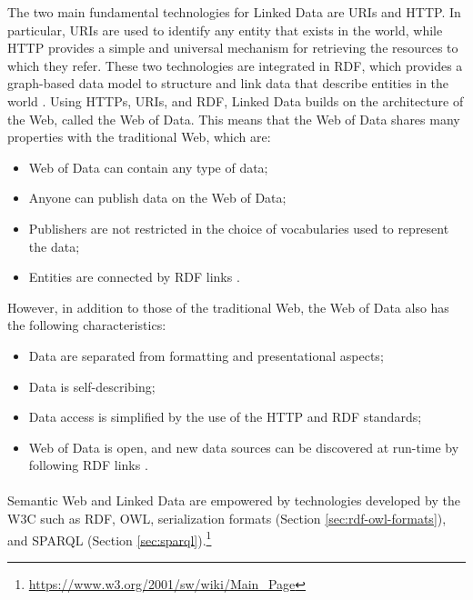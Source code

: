 The two main fundamental technologies for Linked Data are \acp{URI} and \ac{HTTP}. In particular, \acp{URI} are used to identify any entity that exists in the world, while \ac{HTTP} provides a simple and universal mechanism for retrieving the resources to which they refer. These two technologies are integrated in \ac{RDF}, which provides a graph-based data model to structure and link data that describe entities in the world \cite{bizer2011linked}. Using \acp{HTTP}, \acp{URI}, and \ac{RDF}, Linked Data builds on the architecture of the Web, called the Web of Data. This means that the Web of Data shares many properties with the traditional Web, which are:

\begin{itemize}
    \item Web of Data can contain any type of data;
    \item Anyone can publish data on the Web of Data;
    \item Publishers are not restricted in the choice of vocabularies used to represent the data;
    \item Entities are connected by \ac{RDF} links \cite{bizer2011linked}.
\end{itemize}

However, in addition to those of the traditional Web, the Web of Data also has the following characteristics:

\begin{itemize}
    \item Data are separated from formatting and presentational aspects;
    \item Data is self-describing;
    \item Data access is simplified by the use of the \ac{HTTP} and \ac{RDF} standards;
    \item Web of Data is open, and new data sources can be discovered at run-time by following \ac{RDF} links \cite{bizer2011linked}.
\end{itemize}

\paragraph*{}
Semantic Web and Linked Data are empowered by technologies developed by the \acl{W3C} such as \acs{RDF}, \acs{OWL}, serialization formats (Section \ref{sec:rdf-owl-formats}), and \acs{SPARQL} (Section \ref{sec:sparql}).\footnote{\url{https://www.w3.org/2001/sw/wiki/Main_Page}}

